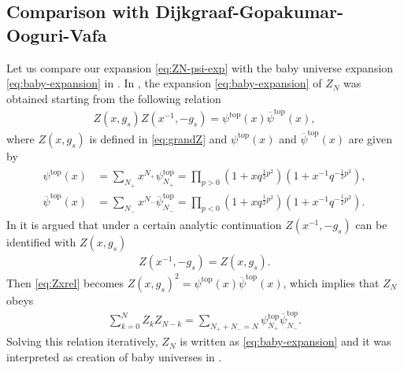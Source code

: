 \documentclass[11pt]{article}
\newcommand{\hf}{\frac{1}{2}}
\def\b#1{\overline{#1}}
\renewcommand{\[}{\begin{eqnarray}}
\renewcommand{\]}{\end{eqnarray}}
\begin{document}
\subsection{Comparison with Dijkgraaf-Gopakumar-Ooguri-Vafa \cite{Dijkgraaf:2005bp}} 

Let us compare our expansion \eqref{eq:ZN-psi-exp}
with the baby universe expansion \eqref{eq:baby-expansion} in \cite{Dijkgraaf:2005bp}.
In \cite{Dijkgraaf:2005bp}, the expansion \eqref{eq:baby-expansion} 
of $Z_N$ was obtained starting from the following
relation
\begin{align}
Z(x,g_s)Z(x^{-1},-g_s)= \psi^{\text{top}}(x)\b{\psi}^{\text{top}}(x), 
\label{eq:Zxrel}
\end{align}
where $Z(x,g_s)$ is defined in \eqref{eq:grandZ} and 
$\psi^{\text{top}}(x)$ and $\b{\psi}^{\text{top}}(x)$ are given by
\begin{align}
 \begin{aligned}
 \psi^{\text{top}}(x)&= \sum_{N_+}x^{N_+}\psi^{\text{top}}_{N_+}=\prod_{p>0}(1+xq^{\hf p^2})(1+x^{-1}q^{-\hf p^2}),\\
\b{\psi}^{\text{top}}(x)&=\sum_{N_-}x^{N_-}\b{\psi}^{\text{top}}_{N_-}=\prod_{p<0}(1+xq^{\hf p^2})
(1+x^{-1}q^{-\hf p^2}).
 \end{aligned}
\end{align}
In \cite{Dijkgraaf:2005bp} it is argued that under a certain 
analytic continuation $Z(x^{-1},-g_s)$
can be identified with $Z(x,g_s)$
\begin{align}
 Z(x^{-1},-g_s)= Z(x,g_s).
\label{eq:acon-baby}
\end{align}
Then \eqref{eq:Zxrel} becomes $Z(x,g_s)^2=\psi^{\text{top}}(x)\b{\psi}^{\text{top}}(x)$,
which implies that $Z_N$ obeys
\begin{align}
 \sum_{k=0}^N Z_k Z_{N-k}=\sum_{N_{+}+N_{-}=N} \psi^{\text{top}}_{N_+}
\b{\psi}^{\text{top}}_{N_-}.
\end{align}
Solving this relation iteratively, $Z_N$ is written 
as \eqref{eq:baby-expansion} and it was interpreted as creation of baby universes 
in \cite{Dijkgraaf:2005bp}.
\end{document}
